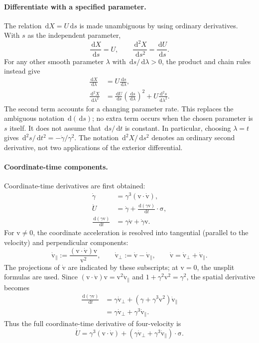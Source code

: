 \documentclass[11pt]{article}
\newcommand{\pv}[1]{{#1}}
\newcommand{\vstyle}[1]{{\bm{\mathrm{#1}}}}
\newcommand{\pU}{\pv{U}}
\newcommand{\pX}{\pv{X}}
\numberwithin{equation}{section}
\newcommand{\dotprod}{\cdot}
\newcommand{\bsig}{\vstyle{\sigma}}
\newcommand{\bv}{\vstyle{v}}
\newcommand{\dd}{\,\mathrm d}
\begin{document}
\paragraph{Differentiate with a specified parameter.}
The relation $\dd\pX=\pU\dd s$ is made unambiguous by using ordinary
derivatives. With $s$ as the independent parameter,
\[
 \frac{\dd\pX}{\dd s}=\pU,\qquad
 \frac{\dd^2\pX}{\dd s^2}=\frac{\dd\pU}{\dd s}.
\]
For any other smooth parameter $\lambda$ with $\dd s/\dd\lambda>0$,
the product and chain rules instead give
\begin{equation}
 \boxed{\begin{aligned}
 \frac{\dd\pX}{\dd\lambda}
 &=\pU\frac{\dd s}{\dd\lambda},\\
 \frac{\dd^2\pX}{\dd\lambda^2}
 &=\frac{\dd\pU}{\dd s}
       \left(\frac{\dd s}{\dd\lambda}\right)^2
   +\pU\frac{\dd^2s}{\dd\lambda^2}.
 \end{aligned}}
 \label{eq:worldline-parameter-chain-rule}
\end{equation}
The second term accounts for a changing parameter rate. This
replaces the ambiguous notation $\dd(\dd s)$; no extra term occurs
when the chosen parameter is $s$ itself.
It does not assume that $\dd s/\dd t$ is constant. In particular,
choosing $\lambda=t$ gives
$\dd^2s/\dd t^2=-\dot\gamma/\gamma^2$.
The notation $\dd^2\pX/\dd s^2$ denotes an ordinary second
derivative, not two applications of the exterior differential.

\paragraph{Coordinate-time components.}
Coordinate-time derivatives are first obtained:
\begin{align*}
 \dot{\gamma}&=\gamma^3(\bv\dotprod\dot{\bv}),\\
 \dot{\pU}&=\dot{\gamma}
 +\frac{\dd(\gamma\bv)}{\dd t}\dotprod\bsig,\\
 \frac{\dd(\gamma\bv)}{\dd t}
 &=\gamma\dot{\bv}+\dot{\gamma}\bv.
\end{align*}
For $\bv\ne0$, the coordinate acceleration is resolved into tangential
(parallel to the velocity) and perpendicular components:
\[
 \dot{\bv}_{\parallel}:=\frac{(\bv\dotprod\dot{\bv})\bv}{\bv^2},
 \qquad \dot{\bv}_{\perp}:=\dot{\bv}-\dot{\bv}_{\parallel},
 \qquad \dot{\bv}=\dot{\bv}_{\perp}+\dot{\bv}_{\parallel}.
\]
The projections of $\dot{\bv}$ are indicated by these subscripts; at $\bv=0$, the unsplit formulas are used.
Since $(\bv\dotprod\dot{\bv})\bv=\bv^2\dot{\bv}_{\parallel}$ and
$1+\gamma^2\bv^2=\gamma^2$, the spatial derivative becomes
\begin{align*}
 \frac{\dd(\gamma\bv)}{\dd t}
 &=\gamma\dot{\bv}_{\perp}
   +(\gamma+\gamma^3\bv^2)\dot{\bv}_{\parallel}\\
 &=\gamma\dot{\bv}_{\perp}+\gamma^3\dot{\bv}_{\parallel}.
\end{align*}
Thus the full coordinate-time derivative of four-velocity is
\begin{equation}
 \dot{\pU}
 =\gamma^3(\bv\dotprod\dot{\bv})
  +(\gamma\dot{\bv}_{\perp}+\gamma^3\dot{\bv}_{\parallel})\dotprod\bsig.
 \label{eq:four-velocity-coordinate-derivative}
\end{equation}
\end{document}
